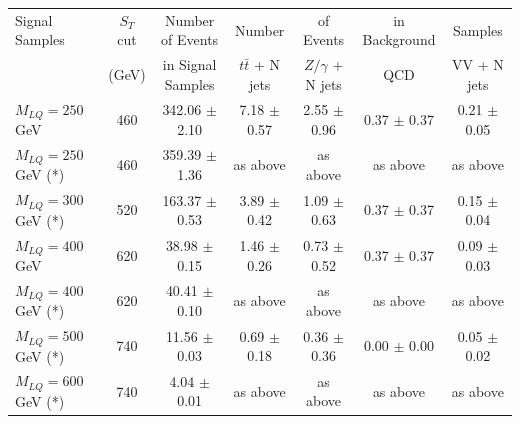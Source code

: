 \documentclass{cmspaper}
\begin{document}
\begin{linenumbers}
\begin{table}[htbp]
\begin{center}
\begin{tabular}{|lcc||cccc|}
\hline\hline
Signal Samples       & $S_T$ cut       & Number of Events     & Number              & of Events           & in Background    & Samples     \\
                     & (GeV)           & in Signal Samples    & $t\bar{t}$ + N jets & $Z/\gamma$ + N jets & QCD              & VV + N jets \\ 
\hline
$M_{LQ}=250~$GeV     & 460             & 342.06 $\pm$ 2.10    & 7.18  $\pm$ 0.57    & 2.55  $\pm$ 0.96    & 0.37 $\pm$ 0.37  & 0.21 $\pm$ 0.05 \\ 
$M_{LQ}=250~$GeV (*) & 460             & 359.39 $\pm$ 1.36    & as above            & as above            & as above         & as above        \\
$M_{LQ}=300~$GeV (*) & 520             & 163.37 $\pm$ 0.53    & 3.89  $\pm$ 0.42    & 1.09  $\pm$ 0.63    & 0.37 $\pm$ 0.37  & 0.15 $\pm$ 0.04 \\ 
$M_{LQ}=400~$GeV     & 620             &  38.98 $\pm$ 0.15    & 1.46  $\pm$ 0.26    & 0.73  $\pm$ 0.52    & 0.37 $\pm$ 0.37  & 0.09 $\pm$ 0.03 \\ 
$M_{LQ}=400~$GeV (*) & 620             &  40.41 $\pm$ 0.10    & as above            & as above            & as above         & as above        \\
$M_{LQ}=500~$GeV (*) & 740             &  11.56 $\pm$ 0.03    & 0.69  $\pm$ 0.18    & 0.36  $\pm$ 0.36    & 0.00 $\pm$ 0.00  & 0.05 $\pm$ 0.02 \\ 
$M_{LQ}=600~$GeV (*) & 740             &   4.04 $\pm$ 0.01    & as above            & as above            & as above         & as above        \\

\end{tabular}
\end{center}
\end{table}
\end{linenumbers}
\end{document}
